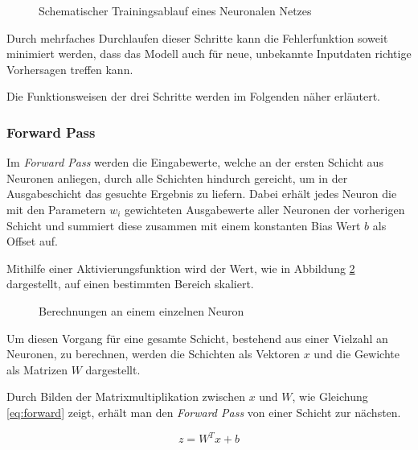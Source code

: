 \vspace{1cm}
\begin{figure}[H]
    \centering
    
    \caption{Schematischer Trainingsablauf eines Neuronalen Netzes}
    \label{fig:train}
\end{figure}
\vspace{1cm}


Durch mehrfaches Durchlaufen dieser Schritte 
kann die Fehlerfunktion soweit minimiert werden, dass 
das Modell auch für neue, unbekannte Inputdaten 
richtige Vorhersagen treffen kann.

Die Funktionsweisen der drei Schritte 
werden im Folgenden näher erläutert.

\subsubsection{Forward Pass}
Im \textit{Forward Pass} werden die Eingabewerte, welche an der 
ersten Schicht aus Neuronen anliegen, durch alle Schichten hindurch 
gereicht, um in der Ausgabeschicht
das gesuchte Ergebnis zu liefern.
Dabei erhält jedes Neuron die mit den Parametern $w_{i}$ gewichteten
Ausgabewerte aller Neuronen der vorherigen Schicht und summiert diese
zusammen mit einem konstanten Bias Wert $b$ als Offset auf.

Mithilfe einer Aktivierungsfunktion wird der Wert, wie 
in Abbildung \ref{fig:neuron} dargestellt, auf
einen bestimmten Bereich skaliert.


\vspace{1cm}
\begin{figure}[H]
    \centering
    
    \caption{Berechnungen an einem einzelnen Neuron}
    \label{fig:neuron}
\end{figure}
\vspace{1cm}

Um diesen Vorgang für eine gesamte Schicht, bestehend aus 
einer Vielzahl an Neuronen, zu berechnen, werden die Schichten 
als Vektoren $x$ und die Gewichte als Matrizen $W$ dargestellt.

Durch Bilden der Matrixmultiplikation zwischen $x$ und $W$,
 wie Gleichung \ref{eq:forward} zeigt,
erhält man den \textit{Forward Pass} von einer Schicht zur nächsten.
\vspace{0.5cm}

\begin{equation}
    \label{eq:forward}
    z = W^{T}x+b
\end{equation}
\vspace{0.5cm}

